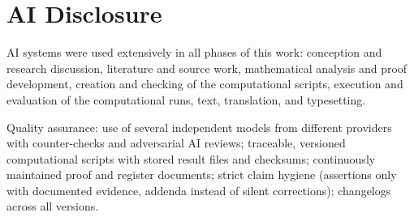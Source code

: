 \section*{AI Disclosure}

\noindent
AI systems were used extensively in all phases of this work: conception
and research discussion, literature and source work, mathematical analysis
and proof development, creation and checking of the computational scripts,
execution and evaluation of the computational runs, text, translation, and
typesetting.

\medskip

\noindent
Quality assurance: use of several independent models from different
providers with counter-checks and adversarial AI reviews; traceable,
versioned computational scripts with stored result files and checksums;
continuously maintained proof and register documents; strict claim hygiene
(assertions only with documented evidence, addenda instead of silent
corrections); changelogs across all versions.

